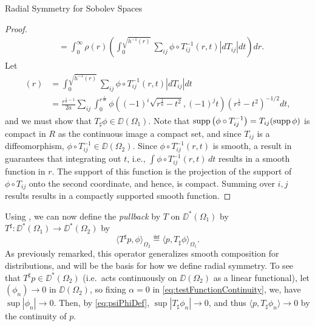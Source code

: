 \begin{chapter}{Radial Symmetry for Sobolev Spaces}
\begin{proof}
\begin{align}
    &= \int_0^\infty \rho(r) \left(\int_0^{\sqrt{h^{-1}(r)}} \sum_{ij}\phi \circ T_{ij}^{-1}(r,t)\left|dT_{ij}\right|dt \right)dr \label{eq:phiEquation}.
  \end{align}
  Let 
  \begin{align}
    [T_\sharp\phi](r) 
      &= \int_0^{\sqrt{h^{-1}(r)}} \sum_{ij}\phi \circ T_{ij}^{-1}(r,t)\left|dT_{ij}\right|dt \\
      &= \frac{r^{\frac 1a -1} }{2a}\sum_{ij}\int_0^{r^{\frac{1}{2a}}} \phi \left((-1)^i\sqrt{r^{\frac 1a} - t^2}, (-1)^jt\right) \left( r^{\frac 1a} - t^2 \right)^{-1/2} dt, \label{eq:psiPhiDef}
  \end{align}
  and we must show that $T_\sharp\phi \in \DD(\Omega_1)$.
  Note that $\operatorname*{supp} \left(\phi \circ T_{ij}^{-1} \right) = T_{ij}( \operatorname*{supp} \phi )$ is compact in $R$ as the continuous image a compact set, and since $T_{ij}$ is a diffeomorphism, $\phi \circ T_{ij}^{-1} \in \DD(\Omega_2)$. 
  Since $\phi\circ T_{ij}^{-1}(r,t)$ is smooth, a result in \cite[pg. 433]{strichartz2000} guarantees that integrating out $t$, i.e., $\int \phi \circ T_{ij}^{-1}(r,t)\,dt$ results in a smooth function in $r$.  
  The support of this function is the projection of the support of $\phi\circ T_{ij}$ onto the second coordinate, and hence, is compact.
  Summing over $i,j$ results results in a compactly supported smooth function.

\end{proof}

Using , we can now define the \emph{pullback} by $T$ on $\DD^*(\Omega_1)$ by $T^\sharp:\DD^*(\Omega_1) \to \DD^*(\Omega_2)$ by
\begin{equation}
  \langle T^\sharp p, \phi \rangle_{\Omega_2} \eqdef \langle p, T_\sharp\phi\rangle_{\Omega_1}.
\end{equation}
As previously remarked, this operator generalizes smooth composition for distributions, and will be the basis for how we define radial symmetry.
To see that $T^\sharp p \in \DD^*(\Omega_2)$ (i.e.~acts continuously on $\DD(\Omega_2)$ as a linear functional), let $(\phi_n) \to 0$ in $\DD(\Omega_2)$, so fixing $\alpha = 0$ in \eqref{eq:testFunctionContinuity}, we, have $\sup|\phi_n| \to 0$. 
Then, by \eqref{eq:psiPhiDef}, $\sup |T_\sharp\phi_n| \to 0$, and thus $\langle p, T_\sharp\phi_n\rangle \to 0$ by the continuity of $p$. 


\end{chapter}

